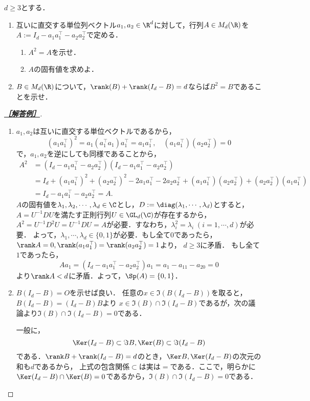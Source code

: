 \documentclass[uplatex,dvipdfmx]{jsarticle}
\begin{document}
\begin{tcolorbox}[colframe=ForestGreen, colback=ForestGreen!10!white,breakable,colbacktitle=ForestGreen!40!white,coltitle=black,fonttitle=\bfseries\sffamily,
    title=第２問]
    $d\ge3$とする．
    \begin{enumerate}
        \item 互いに直交する単位列ベクトル$a_1,a_2\in\R^d$に対して，行列$A\in M_d(\R)$を$A:=I_d-a_1a_1^\top-a_2a_2^\top$で定める．
        \begin{enumerate}
            \item $A^2=A$を示せ．
            \item $A$の固有値を求めよ．
        \end{enumerate}
        \item $B\in M_d(\R)$について，$\rank(B)+\rank(I_d-B)=d$ならば$B^2=B$であることを示せ．
    \end{enumerate}
\end{tcolorbox}
\begin{proof}[\textbf{\underline{［解答例］}}]\mbox{}
    \begin{enumerate}
        \item $a_1,a_2$は互いに直交する単位ベクトルであるから，
        \[(a_1a_1^\top)^2=a_1(a_1^\top a_1)a_1^\top =a_1a_1^\top,\quad (a_1a_1^\top)(a_2a_2^\top)=0\]
        で，$a_1,a_2$を逆にしても同様であることから，
        \begin{align*}
            A^2&=(I_d-a_1a_1^\top-a_2a_2^\top)(I_d-a_1a_1^\top-a_2a_2^\top)\\
            &=I_d+(a_1a_1^\top)^2+(a_2a_2^\top)^2-2a_1a_1^\top-2a_2a_2^\top+(a_1a_1^\top)(a_2a_2^\top)+(a_2a_2^\top)(a_1a_1^\top)\\
            &=I_d-a_1a_1^\top-a_2a_2^\top=A.
        \end{align*}
        $A$の固有値を$\lambda_1,\lambda_2,\cdots,\lambda_d\in\C$とし，$D:=\diag(\lambda_1,\cdots,\lambda_d)$とすると，$A=U^{-1}DU$を満たす正則行列$U\in\GL_d(\C)$が存在するから，$A^2=U^{-1}D^2U=U^{-1}DU=A$が必要．すなわち，$\lambda_i^2=\lambda_i\;(i=1,\cdots,d)$が必要．
        よって，$\lambda_1,\cdots,\lambda_d\in\{0,1\}$が必要．もし全て$0$であったら，
        $\rank A=0,\rank(a_1a_1^\top)=\rank(a_2a_2^\top)=1$より，
        $d\ge3$に矛盾．
        もし全て$1$であったら，
        \[Aa_1=(I_d-a_1a_1^\top-a_2a_2^\top)a_1=a_1-a_11-a_20=0\]
        より$\rank A<d$に矛盾．よって，$\Sp(A)=\{0,1\}$．
        \item $B(I_d-B)=O$を示せば良い．
        任意の$x\in\Im(B(I_d-B))$を取ると，$B(I_d-B)=(I_d-B)B$より
        $x\in\Im(B)\cap\Im(I_d-B)$であるが，次の議論より$\Im(B)\cap\Im(I_d-B)=0$である．

        一般に，\[\Ker(I_d-B)\subset\Im B,\Ker(B)\subset\Im(I_d-B)\]である．$\rank B+\rank(I_d-B)=d$のとき，$\Ker B,\Ker(I_d-B)$の次元の和も$d$であるから，
        上式の包含関係$\subset$は実は$=$である．ここで，明らかに$\Ker(I_d-B)\cap\Ker(B)=0$であるから，$\Im(B)\cap\Im(I_d-B)=0$である．
    \end{enumerate}
\end{proof}
\end{document}
